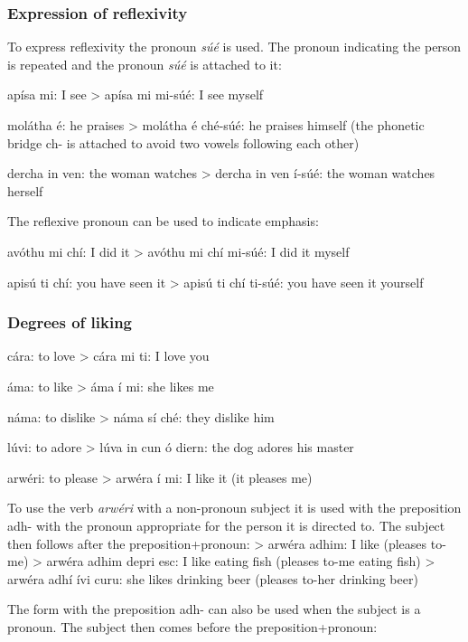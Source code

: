 \subsubsection{Expression of reflexivity}

To express reflexivity the pronoun \textit{s\'{u}\'{e}} is used. The pronoun indicating the person is repeated and the pronoun \textit{s\'{u}\'{e}} is attached to it:

ap\'{i}sa mi: I see
> ap\'{i}sa mi mi-s\'{u}\'{e}: I see myself

mol\'{a}tha \'{e}: he praises
> mol\'{a}tha \'{e} ch\'{e}-s\'{u}\'{e}: he praises himself (the phonetic bridge ch- is attached to avoid two vowels following each other)

dercha in ven: the woman watches
> dercha in ven \'{i}-s\'{u}\'{e}: the woman watches herself

The reflexive pronoun can be used to indicate emphasis:

av\'{o}thu mi ch\'{i}: I did it
> av\'{o}thu mi ch\'{i} mi-s\'{u}\'{e}: I did it myself

apis\'{u} ti ch\'{i}: you have seen it
> apis\'{u} ti ch\'{i} ti-s\'{u}\'{e}: you have seen it yourself

\subsubsection{Degrees of liking}

c\'{a}ra: to love
> c\'{a}ra mi ti: I love you

\'{a}ma: to like
> \'{a}ma \'{i} mi: she likes me

n\'{a}ma: to dislike
> n\'{a}ma s\'{i} ch\'{e}: they dislike him

l\'{u}vi: to adore
> l\'{u}va in cun \'{o} diern: the dog adores his master

arw\'{e}ri: to please
> arw\'{e}ra \'{i} mi: I like it (it pleases me)

To use the verb \textit{arw\'{e}ri} with a non-pronoun subject it is used with the preposition adh- with the pronoun appropriate for the person it is directed to. The subject then follows after the preposition+pronoun:
> arw\'{e}ra adhim: I like (pleases to-me)
> arw\'{e}ra adhim depri esc: I like eating fish (pleases to-me eating fish)
> arw\'{e}ra adh\'{i} \'{i}vi curu: she likes drinking beer (pleases to-her drinking beer)

The form with the preposition adh- can also be used when the subject is a pronoun. The subject then comes before the preposition+pronoun:

